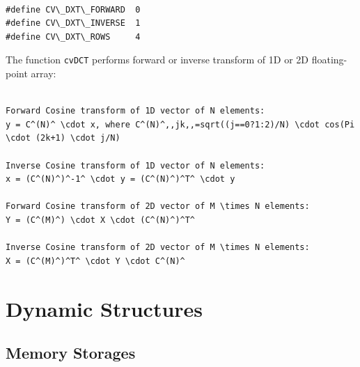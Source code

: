 \begin{lstlisting}

#define CV\_DXT\_FORWARD  0
#define CV\_DXT\_INVERSE  1
#define CV\_DXT\_ROWS     4

\end{lstlisting}

\begin{description}
\end{description}

The function \texttt{cvDCT} performs forward or inverse transform of 1D or 2D floating-point array:

\begin{lstlisting}

Forward Cosine transform of 1D vector of N elements:
y = C^(N)^ \cdot x, where C^(N)^,,jk,,=sqrt((j==0?1:2)/N) \cdot cos(Pi \cdot (2k+1) \cdot j/N)

Inverse Cosine transform of 1D vector of N elements:
x = (C^(N)^)^-1^ \cdot y = (C^(N)^)^T^ \cdot y

Forward Cosine transform of 2D vector of M \times N elements:
Y = (C^(M)^) \cdot X \cdot (C^(N)^)^T^

Inverse Cosine transform of 2D vector of M \times N elements:
X = (C^(M)^)^T^ \cdot Y \cdot C^(N)^

\end{lstlisting}


\section{Dynamic Structures}

\subsection{Memory Storages}

